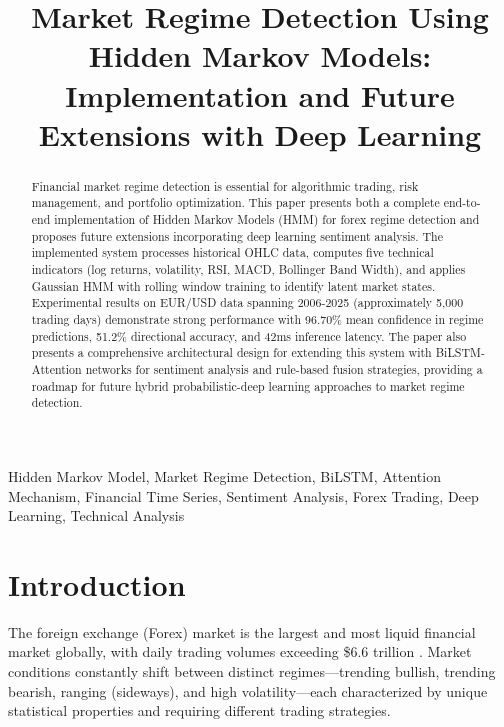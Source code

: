 \documentclass[conference]{IEEEtran}
\begin{document}
\title{Market Regime Detection Using Hidden Markov Models: Implementation and Future Extensions with Deep Learning}

\author{
}

\maketitle

\begin{abstract}
Financial market regime detection is essential for algorithmic trading, risk management, and portfolio optimization. This paper presents both a complete end-to-end implementation of Hidden Markov Models (HMM) for forex regime detection and proposes future extensions incorporating deep learning sentiment analysis. The implemented system processes historical OHLC data, computes five technical indicators (log returns, volatility, RSI, MACD, Bollinger Band Width), and applies Gaussian HMM with rolling window training to identify latent market states. Experimental results on EUR/USD data spanning 2006-2025 (approximately 5,000 trading days) demonstrate strong performance with 96.70\% mean confidence in regime predictions, 51.2\% directional accuracy, and 42ms inference latency. The paper also presents a comprehensive architectural design for extending this system with BiLSTM-Attention networks for sentiment analysis and rule-based fusion strategies, providing a roadmap for future hybrid probabilistic-deep learning approaches to market regime detection.
\end{abstract}

\begin{IEEEkeywords}
Hidden Markov Model, Market Regime Detection, BiLSTM, Attention Mechanism, Financial Time Series, Sentiment Analysis, Forex Trading, Deep Learning, Technical Analysis
\end{IEEEkeywords}

\section{Introduction}
The foreign exchange (Forex) market is the largest and most liquid financial market globally, with daily trading volumes exceeding \$6.6 trillion \cite{bis2022}. Market conditions constantly shift between distinct regimes---trending bullish, trending bearish, ranging (sideways), and high volatility---each characterized by unique statistical properties and requiring different trading strategies.
\end{document}
